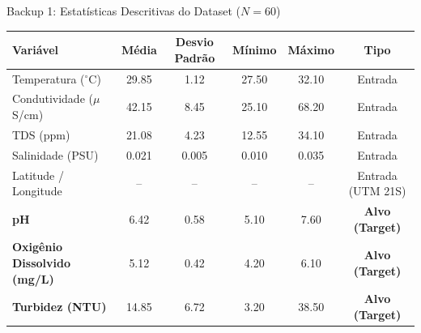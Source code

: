 \documentclass[aspectratio=169,10pt]{beamer}
\begin{document}
\begin{frame}{Backup 1: Estatísticas Descritivas do Dataset ($N=60$)}
  \footnotesize
  \centering
  \begin{tabular}{lccccc}
    \toprule
    \textbf{Variável} & \textbf{Média} & \textbf{Desvio Padrão} & \textbf{Mínimo} & \textbf{Máximo} & \textbf{Tipo} \\
    \midrule
    Temperatura ($^\circ$C) & 29.85 & 1.12 & 27.50 & 32.10 & Entrada \\
    Condutividade ($\mu$S/cm) & 42.15 & 8.45 & 25.10 & 68.20 & Entrada \\
    TDS (ppm) & 21.08 & 4.23 & 12.55 & 34.10 & Entrada \\
    Salinidade (PSU) & 0.021 & 0.005 & 0.010 & 0.035 & Entrada \\
    Latitude / Longitude & -- & -- & -- & -- & Entrada (UTM 21S) \\
    \midrule
    \textbf{pH} & 6.42 & 0.58 & 5.10 & 7.60 & \textbf{Alvo (Target)} \\
    \textbf{Oxigênio Dissolvido (mg/L)} & 5.12 & 0.42 & 4.20 & 6.10 & \textbf{Alvo (Target)} \\
    \textbf{Turbidez (NTU)} & 14.85 & 6.72 & 3.20 & 38.50 & \textbf{Alvo (Target)} \\
    \bottomrule
  \end{tabular}
\end{frame}
\end{document}
